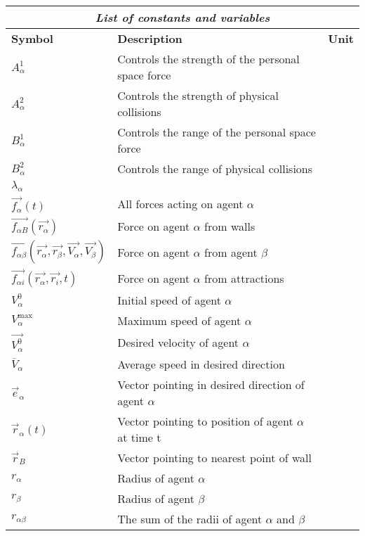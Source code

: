 \documentclass[12pt,a4paper]{report} %
\begin{document}
\begin{center}
\begin{tabular}{lll}
\hline
\multicolumn{3}{|c|}{\emph{List of constants and variables}}\\
\hline
\small{\textbf{Symbol}} & \small{\textbf{Description}} & \small{\textbf{Unit}}\\
\hline
$A_{\alpha}^{1}$ & \small{Controls the strength of the personal space force}\\
\hline
$A_{\alpha}^{2}$ & \small{Controls the strength of physical collisions}  & \\
\hline
$B_{\alpha}^{1}$ & \small{Controls the range of the personal space force} & \\
\hline
$B_{\alpha}^{2}$ & \small{Controls the range of physical collisions} & \\
\hline
$\lambda_{\alpha}$ &  & \\
\hline
$\vec{f_{\alpha}} \left( t \right)$ & All forces acting on agent $\alpha$  & \\
\hline
$\vec{f_{\alpha B}} \left( \vec{r_{\alpha}} \right)$ & Force on agent $\alpha$ from walls & \\
\hline
$\vec{f_{\alpha \beta}} \left( \vec{r_{\alpha}}, \vec{r_{\beta}}, \vec{V_{\alpha}}, \vec{V_{\beta}} \right)$ & Force on agent $\alpha$ from agent $\beta$ & \\
\hline
$\vec{f_{\alpha i}} \left( \vec{r_{\alpha}}, \vec{r_{i}}, t \right)$ & Force on agent $\alpha$ from attractions & \\
\hline
$V_{\alpha}^{0}$ & Initial speed of agent $\alpha$ & \\
\hline
$V_{\alpha}^{\text{max}}$ & Maximum speed of agent $\alpha$ & \\
\hline
$\vec{V_{\alpha}^{\text{0}}}$ & Desired velocity of agent $\alpha$ & \\
\hline
$\overline{V}_{\alpha}$ & Average speed in desired direction & \\
\hline
$\vec{e}_{\alpha}$ & Vector pointing in desired direction of agent $\alpha$ & \\
\hline
$\vec{r}_{\alpha}\left( t \right) $ & Vector pointing to position of agent $\alpha$ at time t & \\
\hline
$\vec{r}_{B}$ & Vector pointing to nearest point of wall & \\
\hline
$r_{\alpha}$ & Radius of agent $\alpha$ & \\
\hline
$r_{\beta}$ & Radius of agent $\beta$ & \\
\hline
$r_{\alpha \beta}$ & The sum of the radii of agent $\alpha$ and $\beta$ & \\

\end{tabular}
\end{center}
\end{document}
